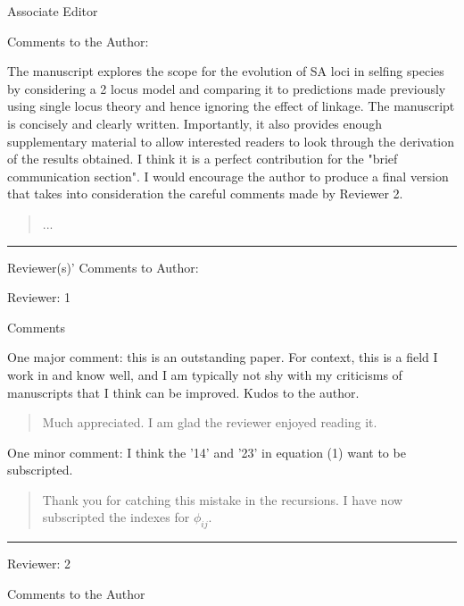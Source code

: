 \documentclass[11pt]{article}
\begin{document}
Associate Editor

\noindent Comments to the Author:
\bigskip 

The manuscript explores the scope for the evolution of SA loci in selfing species by considering a 2 locus model and comparing it to predictions made previously using single locus theory and hence ignoring the effect of linkage. The manuscript is concisely and clearly written. Importantly, it also provides enough supplementary material to allow interested readers to look through the derivation of the results obtained.  I think it is a perfect contribution for the "brief communication section". I would encourage the author to produce a final version that takes into consideration the careful comments made by Reviewer 2.

	\begin{quote}
		...
	\end{quote}

\bigskip
\noindent \rule{8cm}{0.4pt}
\bigskip

\noindent Reviewer(s)' Comments to Author:
\bigskip

\noindent Reviewer: 1
\bigskip

\noindent Comments
\bigskip

\noindent One major comment: this is an outstanding paper. For context, this is a field I work in and know well, and I am typically not shy with my criticisms of manuscripts that I think can be improved. Kudos to the author.

	\begin{quote}
		Much appreciated. I am glad the reviewer enjoyed reading it.
	\end{quote}

\noindent One minor comment: I think the '14' and '23' in equation (1) want to be subscripted.

	\begin{quote}
		Thank you for catching this mistake in the recursions. I have now subscripted the indexes for $\phi_{ij}$.
	\end{quote}



\bigskip
\noindent \rule{8cm}{0.4pt}
\bigskip



\noindent Reviewer: 2
\bigskip

\noindent Comments to the Author
\bigskip
\end{document}
